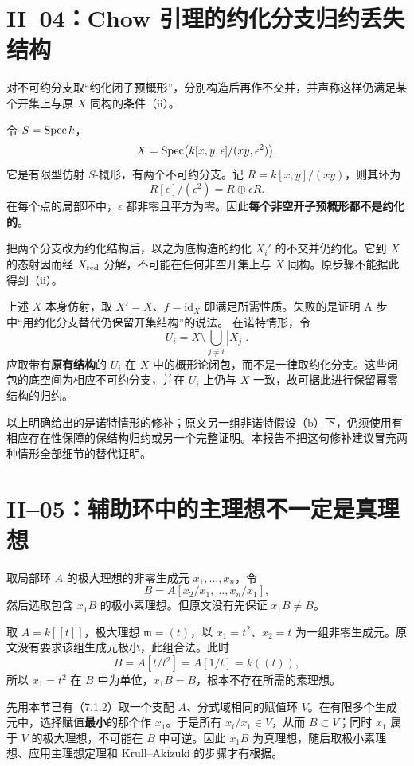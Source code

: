 \section{II--04：Chow 引理的约化分支归约丢失结构}
对不可约分支取“约化闭子预概形”，分别构造后再作不交并，并声称这样仍满足某个开集上与原 $X$ 同构的条件（ii）。
\begin{analysisproof}
令 $S=\operatorname{Spec} k$，
\[
X=\operatorname{Spec}\bigl(k[x,y,\epsilon]/(xy,\epsilon^2)\bigr).
\]
它是有限型仿射 $S$-概形，有两个不可约分支。记 $R=k[x,y]/(xy)$，则其环为
\[
R[\epsilon]/(\epsilon^2)=R\oplus\epsilon R.
\]
在每个点的局部环中，$\epsilon$ 都非零且平方为零。因此\textbf{每个非空开子预概形都不是约化的}。

把两个分支改为约化结构后，以之为底构造的约化 $X_i'$ 的不交并仍约化。它到 $X$ 的态射因而经 $X_{\mathrm{red}}$ 分解，不可能在任何非空开集上与 $X$ 同构。原步骤不能据此得到（ii）。
\end{analysisproof}
上述 $X$ 本身仿射，取 $X'=X$、$f=\mathrm{id}_X$ 即满足所需性质。失败的是证明 A 步中“用约化分支替代仍保留开集结构”的说法。
在诺特情形，令
\[
U_i=X\setminus\bigcup_{j\ne i}|X_j|.
\]
应取带有\textbf{原有结构}的 $U_i$ 在 $X$ 中的概形论闭包，而不是一律取约化分支。这些闭包的底空间为相应不可约分支，并在 $U_i$ 上仍与 $X$ 一致，故可据此进行保留幂零结构的归约。

以上明确给出的是诺特情形的修补；原文另一组非诺特假设（b）下，仍须使用有相应存在性保障的保结构归约或另一个完整证明。本报告不把这句修补建议冒充两种情形全部细节的替代证明。

\section{II--05：辅助环中的主理想不一定是真理想}
取局部环 $A$ 的极大理想的非零生成元 $x_1,\ldots,x_n$，令
\[
B=A[x_2/x_1,\ldots,x_n/x_1],
\]
然后选取包含 $x_1B$ 的极小素理想。但原文没有先保证 $x_1B\ne B$。
\begin{analysisproof}
取 $A=k[[t]]$，极大理想 $\mathfrak m=(t)$，以 $x_1=t^2$、$x_2=t$ 为一组非零生成元。原文没有要求该组生成元极小，此组合法。此时
\[
B=A[t/t^2]=A[1/t]=k((t)),
\]
所以 $x_1=t^2$ 在 $B$ 中为单位，$x_1B=B$，根本不存在所需的素理想。
\end{analysisproof}
先用本节已有（7.1.2）取一个支配 $A$、分式域相同的赋值环 $V$。在有限多个生成元中，选择赋值\textbf{最小}的那个作 $x_1$。于是所有 $x_i/x_1\in V$，从而 $B\subset V$；同时 $x_1$ 属于 $V$ 的极大理想，不可能在 $B$ 中可逆。因此 $x_1B$ 为真理想，随后取极小素理想、应用主理想定理和 Krull--Akizuki 的步骤才有根据。


